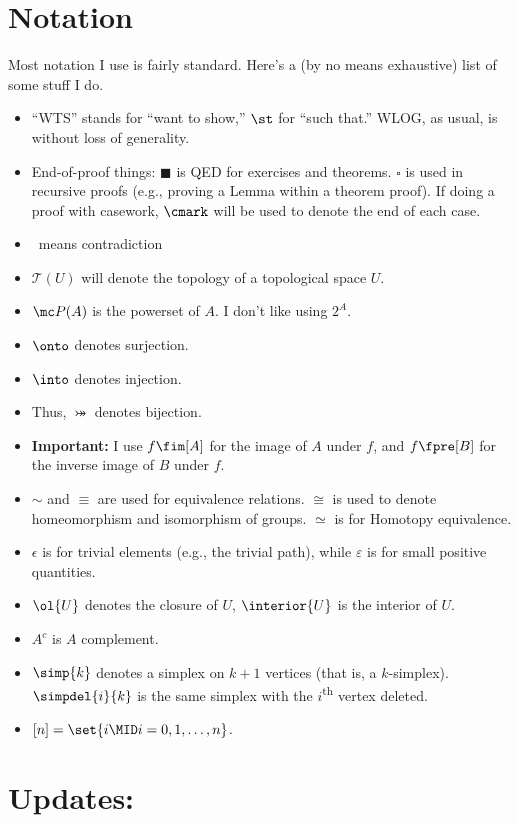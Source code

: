 \documentclass{fkbook}
\begin{document}
\section*{Notation}
Most notation I use is fairly standard. Here's a (by no means exhaustive) list
of some stuff I do.
\begin{itemize}
  \item ``WTS'' stands for ``want to show,'' $\st$ for ``such that.'' WLOG, as
    usual, is without loss of generality.
  \item End-of-proof things: $\blacksquare$ is QED for exercises and theorems.
    $\square$ is used in recursive proofs (e.g., proving a Lemma within a
    theorem proof). If doing a proof with casework, $\cmark$ will be used to
    denote the end of each case.
  \item \contra\ means contradiction
  \item $\mathscr{T}(U)$ will denote the topology of a topological space $U$.
  \item $\mc P(A)$ is the powerset of $A$. I don't like using $2^A$.
  \item $\onto$ denotes surjection.
  \item $\into$ denotes injection.
  \item Thus, $\bij$ denotes bijection.
  \item \textbf{Important:} I use $f\fim[A]$ for the image of $A$ under $f$, and
    $f\fpre[B]$ for the inverse image of $B$ under $f$.
  \item $\sim$ and $\equiv$ are used for equivalence relations. $\cong$ is used
    to denote homeomorphism and isomorphism of groups. $\simeq$ is for Homotopy
    equivalence.
  \item $\epsilon$ is for trivial elements (e.g., the trivial path), while
    $\varepsilon$ is for small positive quantities.
  \item $\ol{U}$ denotes the closure of $U$, $\interior{U}$ is the interior of
    $U$.
  \item $A^c$ is $A$ complement.
  \item $\simp{k}$ denotes a simplex on $k+1$ vertices (that is, a $k$-simplex).
    $\simpdel{i}{k}$ is the same simplex with the $i$\textsuperscript{th} vertex
    deleted.
  \item $[n] = \set{i \MID i = 0,1,\ldots, n}$.
\end{itemize}

\section*{Updates:}
\end{document}
